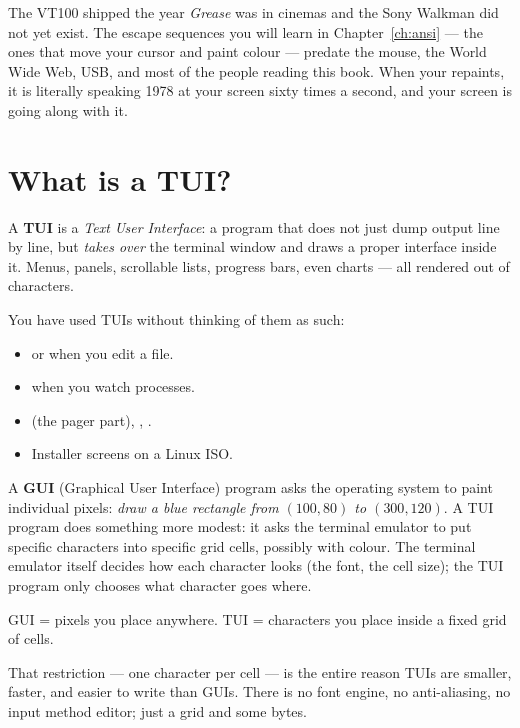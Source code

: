 \begin{funfact}
The VT100 shipped the year \emph{Grease} was in cinemas and the Sony
Walkman did not yet exist. The escape sequences you will learn in
Chapter~\ref{ch:ansi} --- the ones that move your cursor and paint
colour --- predate the mouse, the World Wide Web, USB, and most of
the people reading this book. When your  repaints, it is
literally speaking 1978 at your screen sixty times a second, and your
screen is going along with it.
\end{funfact}

\section{What is a TUI?}

A \textbf{TUI} is a \emph{Text User Interface}: a program that does
not just dump output line by line, but \emph{takes over} the terminal
window and draws a proper interface inside it. Menus, panels,
scrollable lists, progress bars, even charts --- all rendered out of
characters.

You have used TUIs without thinking of them as such:

\begin{itemize}[leftmargin=*]
  \item {} or  when you edit a file.
  \item {} when you watch processes.
  \item {} (the pager part), , .
  \item Installer screens on a Linux ISO.
\end{itemize}

A \textbf{GUI} (Graphical User Interface) program asks the operating
system to paint individual pixels: \emph{draw a blue rectangle from
$(100, 80)$ to $(300, 120)$}. A TUI program does something more
modest: it asks the terminal emulator to put specific characters into
specific grid cells, possibly with colour. The terminal emulator
itself decides how each character looks (the font, the cell size); the
TUI program only chooses what character goes where.

\begin{idea}
GUI = pixels you place anywhere. TUI = characters you place inside a
fixed grid of cells.
\end{idea}

That restriction --- one character per cell --- is the entire reason
TUIs are smaller, faster, and easier to write than GUIs. There is no
font engine, no anti-aliasing, no input method editor; just a grid and
some bytes.

